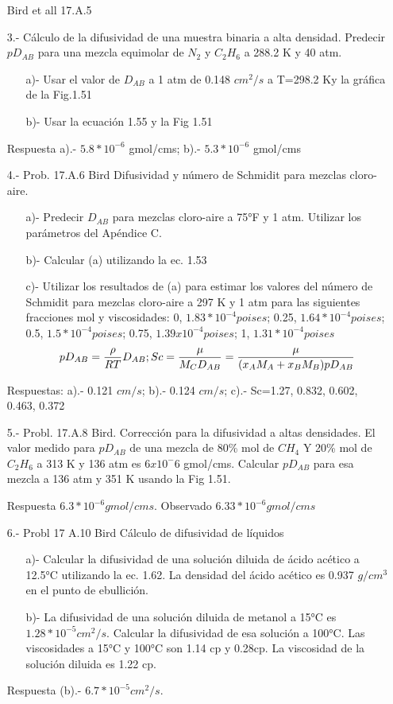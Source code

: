 \begin{itemize}
Bird et all 17.A.5    
\item[3.-] Cálculo de la difusividad de una muestra binaria a alta densidad. 
Predecir $pD_{AB}$ para una mezcla equimolar de $N_{2}$ y $C_{2}H_{6}$ a 288.2 K y 40 atm.
    \begin{itemize}
     \item [a)-] Usar el valor de $D_{AB}$ a 1 atm de  0.148 $cm^2/s$ a T=298.2 Ky la gráfica de la Fig.1.51
     \item [b)-] Usar la ecuación 1.55 y la Fig 1.51
    \end{itemize}    
Respuesta a).- $5.8*10^{-6}$ gmol/cms; b).- $5.3*10^{-6}$ gmol/cms
\item[4.-] Prob. 17.A.6 Bird
Difusividad y número de Schmidit para mezclas cloro-aire. 
    \begin{itemize}
    \item [a)-] Predecir $D_{AB}$ para mezclas cloro-aire a 75°F y 1 atm.
    Utilizar los parámetros del Apéndice C.
    \item [b)-] Calcular (a) utilizando la ec. 1.53
    \item [c)-]Utilizar los resultados de (a) para estimar los valores del número de Schmidit para mezclas cloro-aire a 297 K y 1 atm para las siguientes fracciones mol y viscosidades:
    0, $1.83*10^{-4} poises$; 0.25, $1.64*10^{-4} poises$; 0.5, $1.5*10^{-4} poises$; 0.75, $1.39x10^{-4} poises$; 1, $1.31*10^{-4} poises$
    $$ pD_{AB}= \frac{\rho}{RT}D_{AB}; \space  Sc=\frac{\mu}{M_{C}D_{AB}}=\frac{\mu}{(x_{A}M_{A}+x_{B}M_{B})pD_{AB}}$$
\end{itemize}
Respuestas: a).- 0.121 $cm/s$; b).- 0.124 $cm/s$; c).- Sc=1.27, 0.832, 0.602, 0.463, 0.372
\item[5.-] Probl. 17.A.8 Bird.
Corrección para la difusividad a altas densidades. 
El valor medido para $pD_{AB}$ de una mezcla de 80\% mol de $CH_{4}$ Y 20\% mol de $C_{2}H_{6}$ a 313 K y 136 atm es $6x10^-6$ gmol/cms.
Calcular $pD_{AB}$ para esa mezcla a 136 atm y 351 K usando la Fig 1.51.

Respuesta $6.3*10^{-6} gmol/cm s$. Observado $6.33*10^{-6 }gmol/cm s$
\item[6.-]   Probl 17 A.10 Bird 
Cálculo de difusividad de líquidos 
\begin{itemize}
     \item [a)-] Calcular la difusividad de una solución diluida de ácido acético a 12.5°C utilizando la ec. 1.62. La densidad del ácido acético es 0.937 $g/cm^3$ en el punto de ebullición.
     \item [b)-] La difusividad de una solución diluida de metanol a 15°C es $1.28*10^{-5} cm^2/s$. Calcular la difusividad de esa solución a 100°C. 
     Las viscosidades a 15°C y 100°C son 1.14 cp y 0.28cp.
     La viscosidad de la solución diluida es 1.22 cp.
    \end{itemize}
Respuesta (b).- $6.7*10^{-5} cm^2/s$.
\end{itemize}
\newpage


 